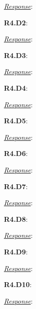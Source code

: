 \documentclass[sigconf]{acmart}
\begin{document}
{\noindent \underline{\sl Response}:}


{\noindent \textbf{R4.D2}}: 

{\noindent \underline{\sl Response}:}



{\noindent \textbf{R4.D3}}: 

{\noindent \underline{\sl Response}:}


{\noindent \textbf{R4.D4}}: 

{\noindent \underline{\sl Response}:}



{\noindent \textbf{R4.D5}}: 

{\noindent \underline{\sl Response}:}




{\noindent \textbf{R4.D6}}: 

{\noindent \underline{\sl Response}:}


{\noindent \textbf{R4.D7}}: 

{\noindent \underline{\sl Response}:}



{\noindent \textbf{R4.D8}}: 

{\noindent \underline{\sl Response}:}


{\noindent \textbf{R4.D9}}: 

{\noindent \underline{\sl Response}:}



{\noindent \textbf{R4.D10}}: 

{\noindent \underline{\sl Response}:}
\end{document}
